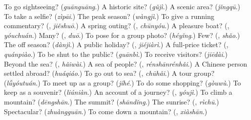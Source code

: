 \begin{tcolorbox}[breakable,colback=teal!4,colframe=teal!35!black,title={Before you move on}]
To go sightseeing? (\emph{guānguāng}.) A historic site? (\emph{gǔjì}.) A scenic area? (\emph{jǐngqū}.) To take a selfie? (\emph{zìpāi}.) The peak season? (\emph{wàngjì}.) To give a running commentary? (\textbf{}, \emph{jiěshuō}.) A spring outing? (\textbf{}, \emph{chūnyóu}.) A pleasure boat? (\textbf{}, \emph{yóuchuán}.) Many? (\textbf{}, \emph{duō}.) To pose for a group photo? (\emph{héyǐng}.) Few? (\textbf{}, \emph{shǎo}.) The off season? (\emph{dànjì}.) A public holiday? (\textbf{}, \emph{jiéjiàrì}.) A full-price ticket? (\textbf{}, \emph{quánpiào}.) To be shut to the public? (\emph{guānbì}.) To receive visitors? (\emph{jiēdài}.) Beyond the sea? (\textbf{}, \emph{hǎiwài}.) A sea of people? (\textbf{}, \emph{rénshānrénhǎi}.) A Chinese person settled abroad? (\emph{huáqiáo}.) To go out to sea? (\textbf{}, \emph{chūhǎi}.) A tour group? (\emph{lǚyóutuán}.) To meet up as a group? (\emph{jíhé}.) To do some shopping? (\emph{gòuwù}.) To keep as a souvenir? (\emph{liúniàn}.) An account of a journey? (\textbf{}, \emph{yóujì}.) To climb a mountain? (\emph{dēngshān}.) The summit? (\emph{shāndǐng}.) The sunrise? (\textbf{}, \emph{rìchū}.) Spectacular? (\emph{zhuàngguān}.) To come down a mountain? (\textbf{}, \emph{xiàshān}.)
\end{tcolorbox}
